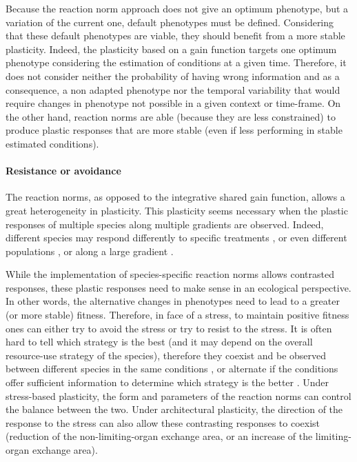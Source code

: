 Because the reaction norm approach does not give an optimum phenotype, but a variation of the current one, default phenotypes must be defined. Considering that these default phenotypes are viable, they should benefit from a more stable plasticity. Indeed, the plasticity based on a gain function targets one optimum phenotype considering the estimation of conditions at a given time. Therefore, it does not consider neither the probability of having wrong information and as a consequence, a non adapted phenotype nor the temporal variability that would require changes in phenotype not possible in a given context or time-frame. On the other hand, reaction norms are able (because they are less constrained) to produce plastic responses that are more stable (even if less performing in stable estimated conditions).


\paragraph{Resistance or avoidance}

The reaction norms, as opposed to the integrative shared gain function, allows a great heterogeneity in plasticity. This plasticity seems necessary when the plastic responses of multiple species along multiple gradients are observed. Indeed, different species may respond differently to specific treatments \parencite{ grassein_plant_2010, freschet_plasticity_2013}, or even different populations \parencite{frei_plastic_2014}, or along a large gradient \parencite{kichenin_contrasting_2013}.

While the implementation of species-specific reaction norms allows contrasted responses, these plastic responses need to make sense in an ecological perspective. In other words, the alternative changes in phenotypes need to lead to a greater (or more stable) fitness. Therefore, in face of a stress, to maintain positive fitness ones can either try to avoid the stress or try to resist to the stress. It is often hard to tell which strategy is the best (and it may depend on the overall resource-use strategy of the species), therefore they coexist and be observed between different species in the same conditions \parencite{perez-ramos_tradeoffs_2013}, or alternate if the conditions offer sufficient information to determine which strategy is the better \parencite{heger_light_2016}. Under stress-based plasticity, the form and parameters of the reaction norms can control the balance between the two. Under architectural plasticity, the direction of the response to the stress can also allow these contrasting responses to coexist (reduction of the non-limiting-organ exchange area, or an increase of the limiting-organ exchange area).

